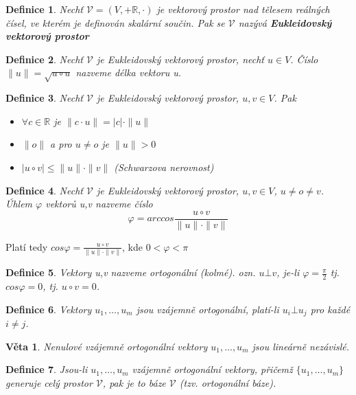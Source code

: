 \documentclass[12pt,a4paper]{article}
\newtheorem{definition}{Definice}
\newtheorem{sentence}{Věta}
\begin{document}
\begin{definition}
	Nechť $\mathscr{V} = (V, + \mathbb{R}, \cdot)$ je vektorový prostor nad tělesem reálných čísel, ve kterém je definován skalární součin. Pak se $\mathscr{V}$ nazývá \textbf{Eukleidovský vektorový prostor}
\end{definition}

\begin{definition}
	Nechť $\mathscr{V}$ je Eukleidovský vektorový prostor, nechť $u \in V$. Číslo $\| u \| = \sqrt{u \circ u}$ nazveme délka vektoru u.
\end{definition}

\begin{definition}
	Nechť $\mathscr{V}$ je Eukleidovský vektorový prostor, $u,v \in V$. Pak
	\begin{itemize}
		\item[a)] $\forall c \in \mathbb{R}$ je $\| c \cdot u \| = |c| \cdot \| u \|$
		\item[b)] $\| o \|$ a pro $u \not= o$ je $\| u \| > 0$
		\item[c)] $|u \circ v| \leq \| u \| \cdot \| v \|$ (Schwarzova nerovnost)
	\end{itemize}
\end{definition}

\begin{definition}
	Nechť $\mathscr{V}$ je Eukleidovský vektorový prostor, $u,v \in V$, $u \not= o \not= v$. Úhlem $\varphi$ vektorů u,v nazveme číslo $$\varphi = arccos \frac{u \circ v}{\| u \| \cdot \| v \|}$$
\end{definition}
Platí tedy $cos \varphi = \frac{u \circ v}{\| u \| \cdot \| v \|}$, kde $0 < \varphi < \pi$

\begin{definition}
	Vektory u,v nazveme ortogonální (kolmé). ozn. $u \bot v$, je-li $\varphi = \frac{\pi}{2}$ tj. $cos \varphi = 0$, tj. $u \circ v = 0$.
\end{definition}

\begin{definition}
	Vektory $u_1, \dots, u_m$ jsou vzájemně ortogonální, platí-li $u_i \bot u_j$ pro každé $i \not= j$.
\end{definition}

\begin{sentence}
	Nenulové vzájemně ortogonální vektory $u_1, \dots, u_m$ jsou lineárně nezávislé.
\end{sentence}

\begin{definition}
	Jsou-li  $u_1, \dots, u_m$ vzájemně ortogonální vektory, přičemž $\{ u_1, \dots, u_m\}$ generuje celý prostor $\mathscr{V}$, pak je to báze $\mathscr{V}$ (tzv. ortogonální báze).
\end{definition}
\end{document}
